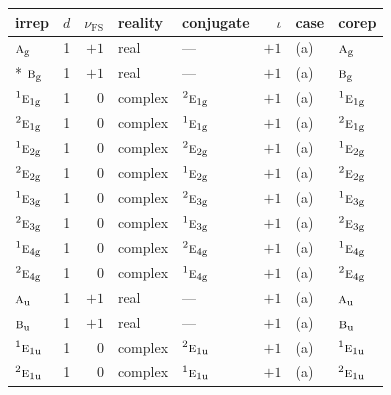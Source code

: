 \documentclass[10pt,a4paper]{article}
\numberwithin{equation}{section}
\newcommand{\irr}[1]{\text{\normalfont\scshape #1}}
\newcommand{\conjpair}[1]{{}^{#1}}
\newcommand{\ptag}[1]{\mathrm{#1}}
\newcommand{\fsind}{\nu_{\mathrm{FS}}}
\begin{document}
{\small\renewcommand{\arraystretch}{1.25}\setlength{\tabcolsep}{4pt}\begin{longtable}{@{}lrrllrll@{}}\toprule
irrep & $d$ & $\fsind$ & reality & conjugate & $\iota$ & case & corep\\\midrule\endhead
\bottomrule\endfoot\endlastfoot
$\irr{a}_{\ptag{g}}$ & 1 & $+1$ & real & --- & $+1$ & (a) & $\irr{a}_{\ptag{g}}$\\*
$\irr{b}_{\ptag{g}}$ & 1 & $+1$ & real & --- & $+1$ & (a) & $\irr{b}_{\ptag{g}}$\\
$\conjpair{1}\irr{e}_{1\ptag{g}}$ & 1 & $0$ & complex & $\conjpair{2}\irr{e}_{1\ptag{g}}$ & $+1$ & (a) & $\conjpair{1}\irr{e}_{1\ptag{g}}$\\
$\conjpair{2}\irr{e}_{1\ptag{g}}$ & 1 & $0$ & complex & $\conjpair{1}\irr{e}_{1\ptag{g}}$ & $+1$ & (a) & $\conjpair{2}\irr{e}_{1\ptag{g}}$\\
$\conjpair{1}\irr{e}_{2\ptag{g}}$ & 1 & $0$ & complex & $\conjpair{2}\irr{e}_{2\ptag{g}}$ & $+1$ & (a) & $\conjpair{1}\irr{e}_{2\ptag{g}}$\\
$\conjpair{2}\irr{e}_{2\ptag{g}}$ & 1 & $0$ & complex & $\conjpair{1}\irr{e}_{2\ptag{g}}$ & $+1$ & (a) & $\conjpair{2}\irr{e}_{2\ptag{g}}$\\
$\conjpair{1}\irr{e}_{3\ptag{g}}$ & 1 & $0$ & complex & $\conjpair{2}\irr{e}_{3\ptag{g}}$ & $+1$ & (a) & $\conjpair{1}\irr{e}_{3\ptag{g}}$\\
$\conjpair{2}\irr{e}_{3\ptag{g}}$ & 1 & $0$ & complex & $\conjpair{1}\irr{e}_{3\ptag{g}}$ & $+1$ & (a) & $\conjpair{2}\irr{e}_{3\ptag{g}}$\\
$\conjpair{1}\irr{e}_{4\ptag{g}}$ & 1 & $0$ & complex & $\conjpair{2}\irr{e}_{4\ptag{g}}$ & $+1$ & (a) & $\conjpair{1}\irr{e}_{4\ptag{g}}$\\
$\conjpair{2}\irr{e}_{4\ptag{g}}$ & 1 & $0$ & complex & $\conjpair{1}\irr{e}_{4\ptag{g}}$ & $+1$ & (a) & $\conjpair{2}\irr{e}_{4\ptag{g}}$\\
$\irr{a}_{\ptag{u}}$ & 1 & $+1$ & real & --- & $+1$ & (a) & $\irr{a}_{\ptag{u}}$\\
$\irr{b}_{\ptag{u}}$ & 1 & $+1$ & real & --- & $+1$ & (a) & $\irr{b}_{\ptag{u}}$\\
$\conjpair{1}\irr{e}_{1\ptag{u}}$ & 1 & $0$ & complex & $\conjpair{2}\irr{e}_{1\ptag{u}}$ & $+1$ & (a) & $\conjpair{1}\irr{e}_{1\ptag{u}}$\\
$\conjpair{2}\irr{e}_{1\ptag{u}}$ & 1 & $0$ & complex & $\conjpair{1}\irr{e}_{1\ptag{u}}$ & $+1$ & (a) & $\conjpair{2}\irr{e}_{1\ptag{u}}$\\

\end{longtable}}
\end{document}
